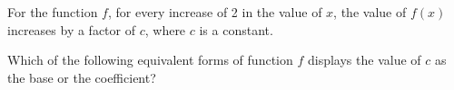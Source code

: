 \vspace{2em}
\newpage

\noindent\markforreview
\vspace{1em}

For the function \(f\), for every increase of 2 in the value of \(x\), the value of \(f(x)\) increases by a factor of \(c\), where \(c\) is a constant.

Which of the following equivalent forms of function \(f\) displays the value of \(c\) as the base or the coefficient?

\vspace{0.75em}

